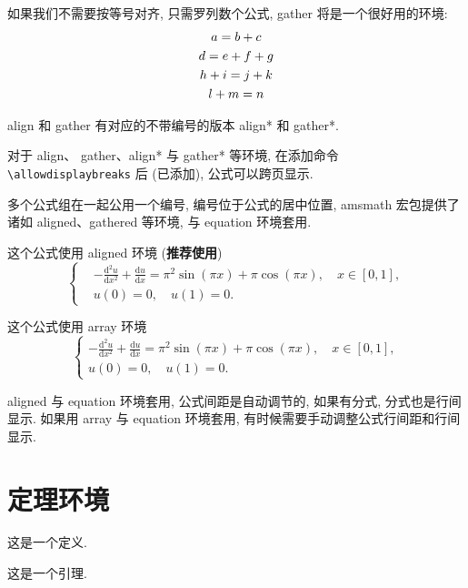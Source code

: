 \documentclass{shnuthesis}
\begin{document}
如果我们不需要按等号对齐, 只需罗列数个公式, gather 将是一个很好用的环境:
\begin{gather}
a = b + c \\
d = e + f + g \\
h + i = j + k \notag \\
l + m = n
\end{gather}

align 和 gather 有对应的不带编号的版本 align* 和 gather*.

对于 align、 gather、align* 与 gather* 等环境, 在添加命令 \verb|\allowdisplaybreaks| 后 (已添加), 公式可以跨页显示.

多个公式组在一起公用一个编号, 编号位于公式的居中位置, amsmath 宏包提供了诸如 aligned、gathered 等环境, 与 equation 环境套用.

这个公式使用 aligned 环境 (\textbf{推荐使用})
\begin{equation}\label{eqn:1}
\left\{\begin{aligned}
  &-\frac{\mathrm{d}^{2} u}{\mathrm{d} x^{2}}+\frac{\mathrm{d} u}{\mathrm{d} x}=\pi^{2} \sin (\pi x)+\pi \cos (\pi x),\quad x \in [0,1], \\
  &u(0)=0,\quad u(1)=0.
\end{aligned} \right.
\end{equation}

这个公式使用 array 环境
\begin{equation}\label{eqn:2}
\left\{\begin{array}{l}
\displaystyle
-\frac{\mathrm{d}^{2} u}{\mathrm{d} x^{2}}+\frac{\mathrm{d} u}{\mathrm{d} x}=\pi^{2} \sin (\pi x)+\pi \cos (\pi x),\quad x \in [0,1], \\[6pt]
u(0)=0,\quad u(1)=0.
\end{array} \right.
\end{equation}

aligned 与 equation 环境套用, 公式间距是自动调节的, 如果有分式, 分式也是行间显示. 如果用 array 与 equation 环境套用, 有时候需要手动调整公式行间距和行间显示.


\section{定理环境}

\begin{definition}
这是一个定义.
\end{definition}

\begin{lemma}[Lemma] \label{lemma1}
这是一个引理.
\end{lemma}
\end{document}
